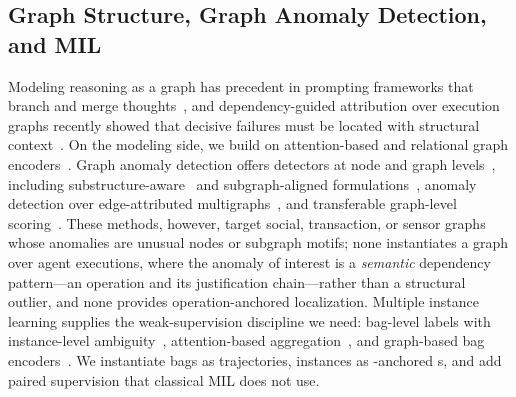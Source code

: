 \subsection{Graph Structure, Graph Anomaly Detection, and MIL}
Modeling reasoning as a graph has precedent in prompting frameworks that branch and merge thoughts~\cite{yao2023tree,besta2023graph}, and dependency-guided attribution over execution graphs recently showed that decisive failures must be located with structural context~\cite{deng2026defa}. On the modeling side, we build on attention-based and relational graph encoders~\cite{velikovi2017graph,brody2021attentive,schlichtkrull2017modeling,hu2020heterogeneous}. Graph anomaly detection offers detectors at node and graph levels~\cite{tang2022rethinking,liu2021anomaly,roy2024gadnr,duan2022arise}, including substructure-aware~\cite{duan2022arise} and subgraph-aligned formulations~\cite{hu2025samcl}, anomaly detection over edge-attributed multigraphs~\cite{sotiropoulos2023adamm}, and transferable graph-level scoring~\cite{wang2026glass}. These methods, however, target social, transaction, or sensor graphs whose anomalies are unusual nodes or subgraph motifs; none instantiates a graph over agent executions, where the anomaly of interest is a \emph{semantic} dependency pattern---an operation and its justification chain---rather than a structural outlier, and none provides operation-anchored localization. Multiple instance learning supplies the weak-supervision discipline we need: bag-level labels with instance-level ambiguity~\cite{carbonneau2016multiple}, attention-based aggregation~\cite{ilse2018attentionbased}, and graph-based bag encoders~\cite{tu2019multiple}. We instantiate bags as trajectories, instances as \aeu{}-anchored \csg{}s, and add paired supervision that classical MIL does not use.

